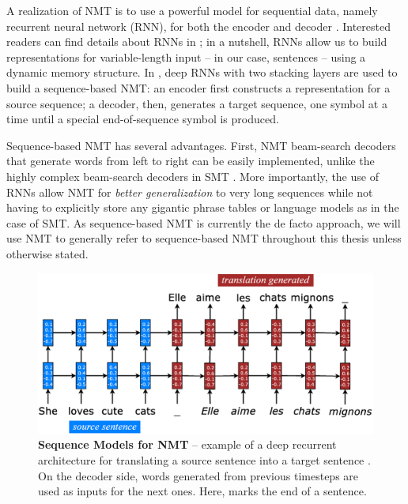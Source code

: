 {A realization of NMT is to use a powerful model for sequential data, namely recurrent
neural network (RNN), for both the encoder and decoder \cite{sutskever14,cho14}.
Interested readers can find details about RNNs in
; in a nutshell, RNNs allow us to build representations for
variable-length input -- in our case, sentences -- using a dynamic memory
structure. In , deep RNNs with two stacking layers are used to build
a sequence-based NMT: an encoder first constructs a representation for a source
sequence; a decoder, then, generates a target sequence,
one symbol at a time until a special end-of-sequence symbol is produced.

Sequence-based NMT has several advantages.
First, NMT beam-search decoders that generate words from left to right can be
easily implemented, unlike the highly complex beam-search decoders in SMT
\cite{Koehn:2003:SMT}. More importantly, the use of
RNNs allow NMT for {\it better generalization} to very long
sequences while not having to  explicitly store any gigantic
phrase tables or language models as in the case of SMT.
As sequence-based NMT is currently the de facto approach, we will use NMT to
generally refer to sequence-based NMT
throughout this thesis unless otherwise stated.

\begin{figure}[tbh!]
\centering
\includegraphics[width=\textwidth, clip=true, trim= 0 0 0
0]{img/nmt_intro} %
\caption[Sequence Models for NMT]{{\bf Sequence Models for NMT} -- example of a
deep recurrent architecture for translating a source sentence  into a target sentence . On the
decoder side, words generated from previous timesteps are used as inputs for the
next ones. Here, \word{\texttt{\_}} marks the end of a sentence.
} 
\label{f:nmt}
\end{figure}



}

